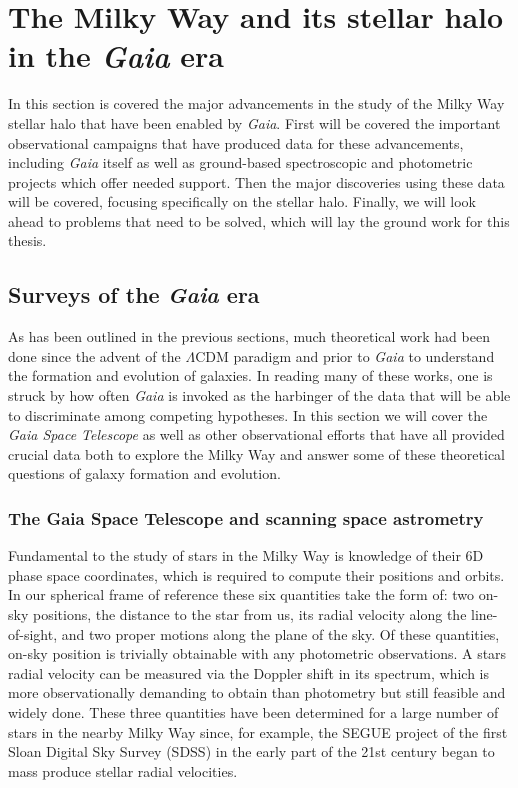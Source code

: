 
\section{The Milky Way and its stellar halo in the \textit{Gaia} era}

In this section is covered the major advancements in the study of the Milky Way stellar halo that have been enabled by \textit{Gaia}. First will be covered the important observational campaigns that have produced data for these advancements, including \textit{Gaia} itself as well as ground-based spectroscopic and photometric projects which offer needed support. Then the major discoveries using these data will be covered, focusing specifically on the stellar halo. Finally, we will look ahead to problems that need to be solved, which will lay the ground work for this thesis.

\subsection{Surveys of the \textit{Gaia} era}

As has been outlined in the previous sections, much theoretical work had been done since the advent of the $\Lambda$CDM paradigm and prior to \textit{Gaia} to understand the formation and evolution of galaxies. In reading many of these works, one is struck by how often \textit{Gaia} is invoked as the harbinger of the data that will be able to discriminate among competing hypotheses. In this section we will cover the \textit{Gaia Space Telescope} as well as other observational efforts that have all provided crucial data both to explore the Milky Way and answer some of these theoretical questions of galaxy formation and evolution.

\subsubsection{The Gaia Space Telescope and scanning space astrometry}

Fundamental to the study of stars in the Milky Way is knowledge of their 6D phase space coordinates, which is required to compute their positions and orbits. In our spherical frame of reference these six quantities take the form of: two on-sky positions, the distance to the star from us, its radial velocity along the line-of-sight, and two proper motions along the plane of the sky. Of these quantities, on-sky position is trivially obtainable with any photometric observations. A stars radial velocity can be measured via the Doppler shift in its spectrum, which is more observationally demanding to obtain than photometry but still feasible and widely done. These three quantities have been determined for a large number of stars in the nearby Milky Way since, for example, the SEGUE project of the first Sloan Digital Sky Survey (SDSS) in the early part of the 21st century began to mass produce stellar radial velocities.

